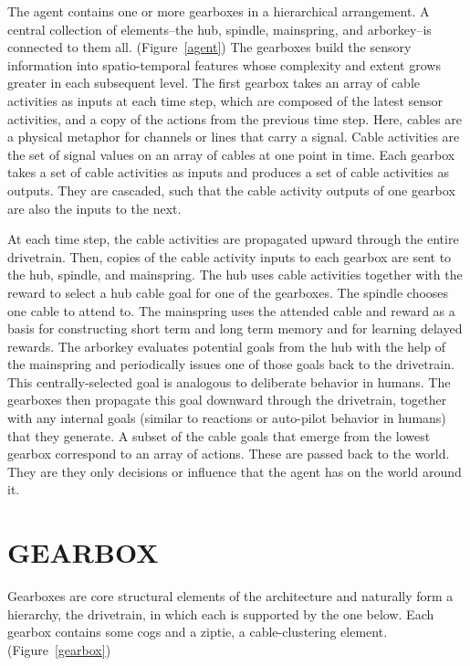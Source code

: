\documentclass[oneside,twocolumn]{article}
\begin{document}
The agent contains one or more gearboxes in a hierarchical arrangement. A central collection of elements--the hub, spindle, mainspring, and arborkey--is connected to them all. (Figure~\ref{agent}) The gearboxes build the sensory information into spatio-temporal features whose complexity and extent grows greater in each subsequent level. The first gearbox takes an array of cable activities as inputs at each time step, which are composed of the latest sensor activities, and a copy of the actions from the previous time step. Here, cables are a physical metaphor for channels or lines that carry a signal. Cable activities are the set of signal values on an array of cables at one point in time. Each gearbox takes a set of cable activities as inputs and produces a set of cable activities as outputs. They are cascaded, such that the cable activity outputs of one gearbox are also the inputs to the next.

At each time step, the cable activities are propagated upward through the entire drivetrain. Then, copies of the cable activity inputs to each gearbox are sent to the hub, spindle, and mainspring. The hub uses cable activities together with the reward to select a hub cable goal for one of the gearboxes. The spindle chooses one cable to attend to. The mainspring uses the attended cable and reward as a basis for constructing short term and long term memory and for learning delayed rewards. The arborkey evaluates potential goals from the hub with the help of the mainspring and periodically issues one of those goals back to the drivetrain. This centrally-selected goal is analogous to deliberate behavior in humans. The gearboxes then propagate this goal downward through the drivetrain, together with any internal goals (similar to reactions or auto-pilot behavior in humans) that they generate. A subset of the cable goals that emerge from the lowest gearbox correspond to an array of actions. These are passed back to the world. They are they only decisions or influence that the agent has on the world around it.

\section*{\color{copper} GEARBOX}

Gearboxes are core structural elements of the architecture and naturally form a hierarchy, the drivetrain, in which each is supported by the one below. Each gearbox contains some cogs and a ziptie, a cable-clustering element. (Figure~\ref{gearbox}) 
\end{document}
